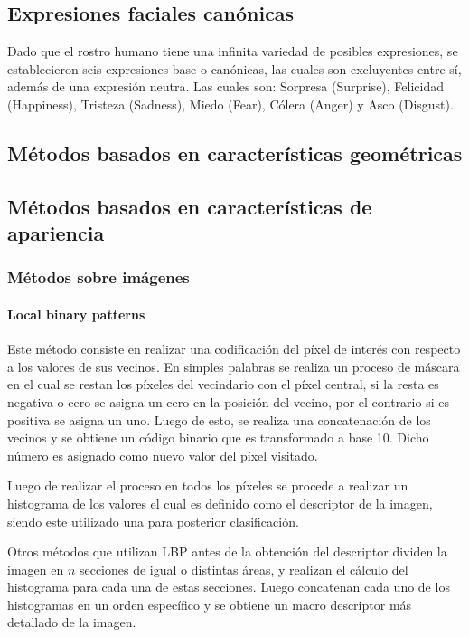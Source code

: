 \subsection{Expresiones faciales canónicas}
\label{sec:type_fe}
Dado que el rostro humano tiene una infinita variedad de posibles expresiones, se establecieron seis expresiones base o canónicas, las cuales son excluyentes entre sí, además de una expresión neutra. Las cuales son: Sorpresa (Surprise), Felicidad (Happiness), Tristeza (Sadness), Miedo (Fear), Cólera (Anger) y Asco (Disgust).


\subsection{Métodos basados en características geométricas}
\label{sec:met_geo}

\subsection{Métodos basados en características de apariencia}
\label{sec:met_apa}

	\subsubsection{Métodos sobre imágenes}
	\label{sec:met_imagen}

		\paragraph{Local binary patterns}
		\label{sec:lbp}
		Este método consiste en realizar una codificación del píxel de interés con respecto a los valores de sus vecinos. En simples palabras se realiza un proceso de máscara en el cual se restan los píxeles del vecindario con el píxel central, si la resta es negativa o cero se asigna un cero en la posición del vecino, por el contrario si es positiva se asigna un uno. Luego de esto, se realiza una concatenación de los vecinos y se obtiene un código binario que es transformado a base 10. Dicho número es asignado como nuevo valor del píxel visitado.

Luego de realizar el proceso en todos los píxeles se procede a realizar un histograma de los valores el cual es definido como el descriptor de la imagen, siendo este utilizado una para posterior clasificación.

Otros métodos que utilizan LBP antes de la obtención del descriptor dividen la imagen en $n$ secciones de igual o distintas áreas, y realizan el cálculo del histograma para cada una de estas secciones. Luego concatenan cada uno de los histogramas en un orden específico y se obtiene un macro descriptor más detallado de la imagen.


